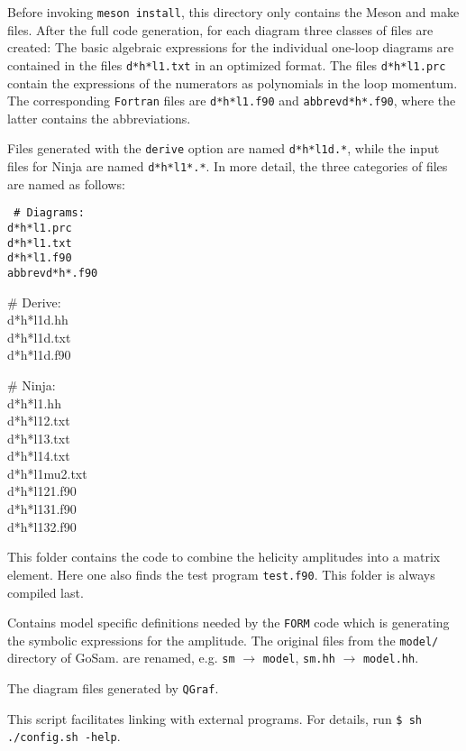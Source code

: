 \documentclass[11pt,a4paper]{refrep}
\newcommand{\gosamversion}{{3{.}0}}
\newcommand{\gosamv}[1][\gosamversion]{{\sc GoSam}\xspace}
\newcommand{\qgraf}{{\tt QGraf}\xspace}
\newcommand{\form}{{\tt FORM}\xspace}
\newcommand{\ninja}{{\sc Ninja}\xspace}
\begin{document}
Before invoking \texttt{meson install}, 
this directory only contains the Meson and make files. After the full code
generation, for each diagram three classes of files are created: The
basic algebraic expressions for the individual one-loop diagrams are
contained in the files {\tt d*h*l1.txt} in an optimized format. The
files {\tt d*h*l1.prc} contain the expressions of the numerators as 
polynomials in the loop momentum. The corresponding {\tt Fortran} files
are {\tt d*h*l1.f90} and {\tt abbrevd*h*.f90}, where the latter
contains the abbreviations. 

Files generated with the {\tt derive} option  are
named {\tt d*h*l1d.*}, while the input files
for \ninja{}  are named {\tt d*h*l1*.*}. 
In more detail, the three categories of files are named as follows:\\
{\tt
\# Diagrams:\\
 d*h*l1.prc\\
 d*h*l1.txt\\
 d*h*l1.f90\\
 abbrevd*h*.f90

\# Derive:\\
 d*h*l1d.hh\\
 d*h*l1d.txt\\
 d*h*l1d.f90

\# Ninja:\\
 d*h*l1.hh\\
 d*h*l12.txt\\
 d*h*l13.txt\\
 d*h*l14.txt\\
 d*h*l1mu2.txt\\
 d*h*l121.f90\\
 d*h*l131.f90\\
 d*h*l132.f90
}

 This folder contains the code to combine
the helicity amplitudes into a matrix element. Here one also finds
the test program \texttt{test.f90}. This folder is always compiled last.

Contains model specific definitions needed by the \form code
which is generating the symbolic expressions for the amplitude.
The original files from the \texttt{model/} directory of \gosamv. 
are renamed, e.g.
\texttt{sm} $\to$ \texttt{model}, \texttt{sm.hh} $\to$ \texttt{model.hh}.

 The diagram files generated
by \qgraf.

 This script facilitates linking with external
programs. For details, run
{\tt \$ sh ./config.sh -help}.
\end{document}
